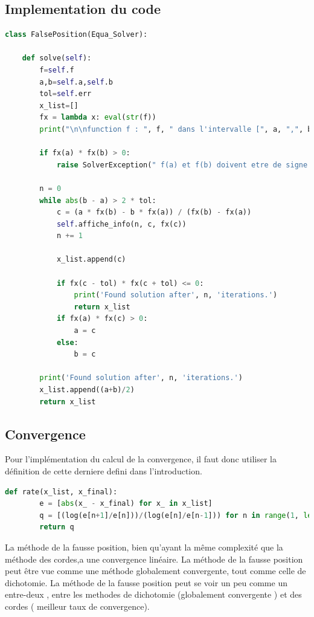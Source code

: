 \documentclass{article}
\begin{document}
\subsection{Implementation du code}
\begin{lstlisting}[language=Python, caption=Méthode de la Fausse Position en Python]
class FalsePosition(Equa_Solver):

    def solve(self):
        f=self.f
        a,b=self.a,self.b
        tol=self.err
        x_list=[]
        fx = lambda x: eval(str(f))
        print("\n\nfunction f : ", f, " dans l'intervalle [", a, ",", b, "] \n", "--------------------------------")

        if fx(a) * fx(b) > 0:
            raise SolverException(" f(a) et f(b) doivent etre de signe different !")

        n = 0
        while abs(b - a) > 2 * tol:
            c = (a * fx(b) - b * fx(a)) / (fx(b) - fx(a))
            self.affiche_info(n, c, fx(c))
            n += 1

            x_list.append(c)

            if fx(c - tol) * fx(c + tol) <= 0:
                print('Found solution after', n, 'iterations.')
                return x_list
            if fx(a) * fx(c) > 0:
                a = c
            else:
                b = c
            
        print('Found solution after', n, 'iterations.')
        x_list.append((a+b)/2)
        return x_list
\end{lstlisting}
\newpage
\subsection{Convergence}
Pour l'implémentation du calcul de la convergence, il faut donc utiliser la définition de cette derniere defini dans l'introduction. 
\begin{lstlisting}[language=Python, caption=Calcul de convergence en Python]
    def rate(x_list, x_final):
        e = [abs(x_ - x_final) for x_ in x_list]
        q = [(log(e[n+1]/e[n]))/(log(e[n]/e[n-1])) for n in range(1, len(e)-1, 1)]
        return q
\end{lstlisting}
La méthode de la fausse position, bien qu’ayant la même complexité que la méthode des cordes,a une convergence linéaire.
La méthode de la fausse position peut être vue comme une méthode globalement convergente, tout comme celle de dichotomie.
La méthode de la fausse position peut se voir un peu comme un entre-deux , entre les methodes de dichotomie (globalement convergente ) et des cordes ( meilleur taux de convergence).
\end{document}
